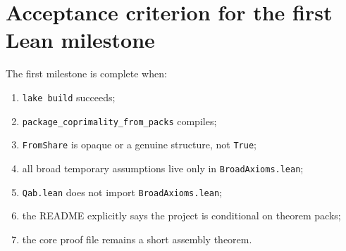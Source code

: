 \documentclass[11pt]{article}
\begin{document}
\section{Acceptance criterion for the first Lean milestone}

The first milestone is complete when:
\begin{enumerate}[label=(\arabic*)]
\item \verb|lake build| succeeds;
\item \verb|package_coprimality_from_packs| compiles;
\item \verb|FromShare| is opaque or a genuine structure, not \verb|True|;
\item all broad temporary assumptions live only in \verb|BroadAxioms.lean|;
\item \verb|Qab.lean| does not import \verb|BroadAxioms.lean|;
\item the README explicitly says the project is conditional on theorem packs;
\item the core proof file remains a short assembly theorem.
\end{enumerate}
\end{document}
